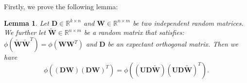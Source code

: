 \documentclass[10pt,journal,compsoc]{IEEEtran}
\newtheorem{lemma}[theorem]{Lemma}
\begin{document}
Firstly, we prove the following lemma:

\begin{lemma}
Let $\mathbf{D}\in \mathbb{R}^{k\times n}$ and $\mathbf{W}\in\mathbb{R}^{n\times m}$ be two independent random matrices. We further let $\widetilde{\mathbf{W}}\in \mathbb{R}^{n\times m}$ be a random matrix that satisfies: $\phi(\widetilde{\mathbf{W}}\widetilde{\mathbf{W}}^T) = \phi(\mathbf{WW}^T)$ and $\mathbf{D}$ be an expectant orthogonal matrix. Then we have
\begin{equation}
    \phi\left(\left(\mathbf{DW}\right)\left(\mathbf{DW}\right)^T\right) = \phi\left(\left(\mathbf{UD}\widetilde{\mathbf{W}}\right)\left(\mathbf{UD}\widetilde{\mathbf{W}}\right)^T\right).
\label{equ:exp_diag_lemma_equ}
\end{equation}
\label{lemma:exp_diag_lemma}
\end{lemma}
\end{document}
